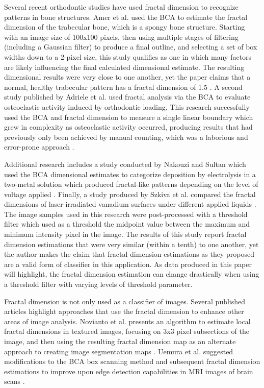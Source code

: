 \documentclass[12pt, oneside]{book}
\begin{document}
Several recent orthodontic studies have used fractal dimension to recognize patterns in bone structures. Amer et al. used the BCA to estimate the fractal dimension of the trabecular bone, which is a spongy bone structure. Starting with an image size of 100x100 pixels, then using multiple stages of filtering (including a Gaussian filter) to produce a final outline, and selecting a set of box widths down to a 2-pixel size, this study qualifies as one in which many factors are likely influencing the final calculated dimensional estimate.  The resulting dimensional results were very close to one another, yet the paper claims that a normal, healthy trabecular pattern has a fractal dimension of 1.5 \cite{amer_anatomical_2012}.  A second study published by Adriele et al. used fractal analysis via the BCA to evaluate osteoclastic activity induced by orthodontic loading.  This research successfully used the BCA and fractal dimension to measure a single linear boundary which grew in complexity as osteoclastic activity occurred, producing results that had previously only been achieved by manual counting, which was a laborious and error-prone approach \cite{adriele_silveira_new_2015}.

Additional research includes a study conducted by Nakouzi and Sultan which used the BCA dimensional estimates to categorize deposition by electrolysis in a two-metal solution which produced fractal-like patterns depending on the level of voltage applied \cite{nakouzi_fractal_2011}.  Finally, a study produced by Szkiva et al. compared the fractal dimensions of laser-irradiated vanadium surfaces under different applied liquids \cite{szkiva_fractal_2013}. The image samples used in this research were post-processed with a threshold filter which used as a threshold the midpoint value between the maximum and minimum intensity pixel in the image. The results of this study report fractal dimension estimations that were very similar (within a tenth) to one another, yet the author makes the claim that fractal dimension estimations as they proposed are a valid form of classifier in this application. As data produced in this paper will highlight, the fractal dimension estimation can change drastically when using a threshold filter with varying levels of threshold parameter.

Fractal dimension is not only used as a classifier of images.  Several published articles highlight approaches that use the fractal dimension to enhance other areas of image analysis.  Novianto et al. presents an algorithm to estimate local fractal dimensions in textured images, focusing on 3x3 pixel subsections of the image, and then using the resulting fractal dimension map as an alternate approach to creating image segmentation maps \cite{novianto_near_2003}.  Uemura et al. suggested modifications to the BCA box scanning method and subsequent fractal dimension estimations to improve upon edge detection capabilities in MRI images of brain scans  \cite{uemura_generation_2000}.
\end{document}
